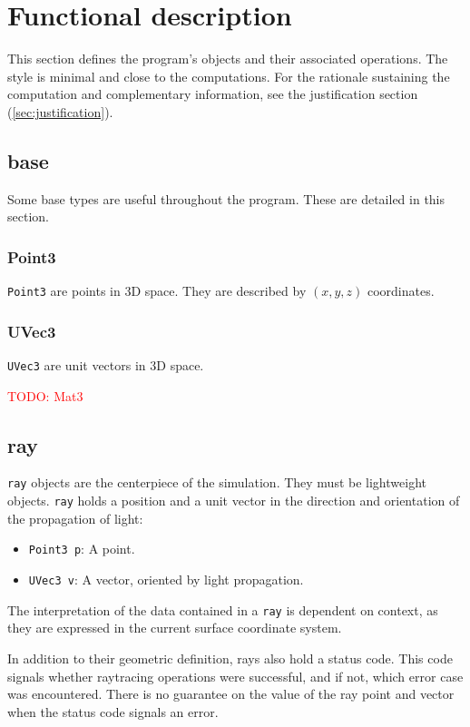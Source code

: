 \section{Functional description}
This section defines the program's objects and their associated
operations. The style is minimal and close to the computations. For
the rationale sustaining the computation and complementary information,
see the justification section (\cref{sec:justification}).

\subsection{base}
Some base types are useful throughout the program. These are detailed in this
section.

\subsubsection{Point3}
\lstinline{Point3} are points in 3D space. They are described by $(x, y, z)$
coordinates.

\subsubsection{UVec3}
\lstinline{UVec3} are unit vectors in 3D space.

\textcolor{red}{TODO: Mat3}

\subsection{ray}
\lstinline{ray} objects are the centerpiece of the simulation. They must be
lightweight objects.  \lstinline{ray} holds a position and a unit vector in the
direction and orientation of the propagation of light:

\begin{itemize}
\item \lstinline{Point3 p}: A point.
\item \lstinline{UVec3 v}: A vector, oriented by light propagation.
\end{itemize}

The interpretation of the data contained in a \lstinline{ray} is dependent
on context, as they are expressed in the current surface coordinate system.

In addition to their geometric definition, rays also hold a status code.
This code signals whether raytracing operations were successful, and if
not, which error case was encountered. There is no guarantee on the value
of the ray point and vector when the status code signals an error.

